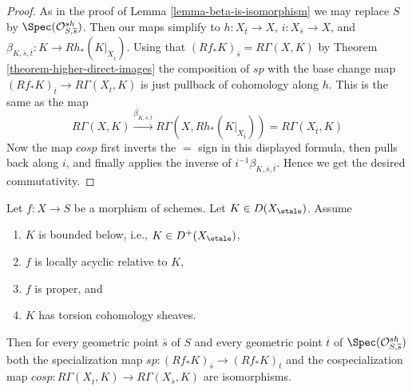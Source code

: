 \begin{proof}
As in the proof of Lemma \ref{lemma-beta-is-isomorphism}
we may replace $S$ by $\Spec(\mathcal{O}^{sh}_{S, \overline{s}})$.
Then our maps simplify to $h : X_{\overline{t}} \to X$,
$i : X_{\overline{s}} \to X$, and
$\beta_{K, \overline{s}, \overline{t}} : K \to Rh_*(K|_{X_{\overline{t}}})$.
Using that $(Rf_*K)_{\overline{s}} = R\Gamma(X, K)$ by
Theorem \ref{theorem-higher-direct-images}
the composition of $sp$ with the base change map
$(Rf_*K)_{\overline{t}} \to R\Gamma(X_{\overline{t}}, K)$
is just pullback of cohomology along $h$.
This is the same as the map
$$
R\Gamma(X, K) \xrightarrow{\beta_{K, \overline{s}, \overline{t}}}
R\Gamma(X, Rh_*(K|_{X_{\overline{t}}})) =
R\Gamma(X_{\overline{t}}, K)
$$
Now the map $cosp$ first inverts the $=$ sign in this displayed
formula, then pulls back along $i$, and finally applies
the inverse of $i^{-1}\beta_{K, \overline{s}, \overline{t}}$.
Hence we get the desired commutativity.
\end{proof}

\begin{lemma}
\label{lemma-sp-isom-proper-torsion-loc-ac}
Let $f : X \to S$ be a morphism of schemes. Let $K \in D(X_\etale)$.
Assume
\begin{enumerate}
\item $K$ is bounded below, i.e., $K \in D^+(X_\etale)$,
\item $f$ is locally acyclic relative to $K$,
\item $f$ is proper, and
\item $K$ has torsion cohomology sheaves.
\end{enumerate}
Then for every geometric point $\overline{s}$ of $S$ and every geometric
point $\overline{t}$ of $\Spec(\mathcal{O}^{sh}_{S, \overline{s}})$
both the specialization map
$sp : (Rf_*K)_{\overline{s}} \to (Rf_*K)_{\overline{t}}$
and the cospecialization map
$cosp : R\Gamma(X_{\overline{t}}, K) \to R\Gamma(X_{\overline{s}}, K)$
are isomorphisms.
\end{lemma}

